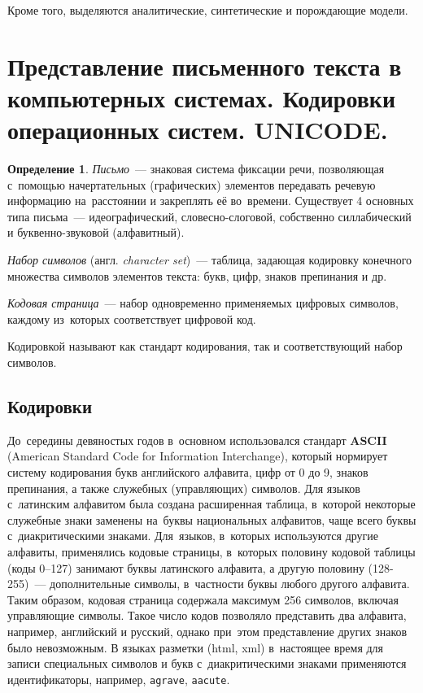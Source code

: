 \documentclass[12pt]{article}
\theoremstyle{definition}
\newtheorem*{defn}{Определение}
\theoremstyle{remark}
\numberwithin{equation}{section}
\begin{document}
Кроме того, выделяются аналитические, синтетические и порождающие модели.

\section{Представление письменного текста в компьютерных системах. 
Кодировки операционных систем. UNICODE.}
\begin{defn}
\textsl{Письмо}~--- знаковая система фиксации речи, позволяющая с~помощью 
начертательных (графических) элементов передавать речевую информацию 
на~расстоянии и закреплять её во~времени. Существует 4 основных типа 
письма~--- идеографический, словесно-слоговой, собственно силлабический 
и буквенно-звуковой (алфавитный).

{\sl Набор символов} (англ. {\sl character set})~--- таблица, задающая 
кодировку конечного множества символов элементов текста: букв, цифр, 
знаков препинания и др.

{\sl Кодовая страница}~--- набор одновременно применяемых цифровых символов, 
каждому из~которых соответствует цифровой код.
\end{defn}

Кодировкой называют как стандарт кодирования, так и соответствующий набор 
символов.

\subsection{Кодировки}
До~середины девяностых годов в~основном использовался стандарт \textbf{ASCII} 
(American Standard Code for Information Interchange), который нормирует систему 
кодирования букв английского алфавита, цифр от 0 до 9, знаков препинания, а также 
служебных (управляющих) символов. Для языков с~латинским алфавитом была создана 
расширенная таблица, в~которой некоторые служебные знаки заменены на~буквы 
национальных алфавитов, чаще всего буквы с~диакритическими знаками. Для~языков, 
в~которых используются другие алфавиты, применялись кодовые страницы, в~которых 
половину кодовой таблицы (коды 0--127) занимают буквы латинского алфавита, 
а другую половину (128-255)~--- дополнительные символы, в~частности буквы любого 
другого алфавита. Таким образом, кодовая страница содержала максимум 256 символов, 
включая управляющие символы. Такое число кодов позволяло представить два алфавита, 
например, английский и русский, однако при~этом представление других знаков 
было невозможным. В языках разметки (html, xml) в~настоящее время для записи 
специальных символов и букв с~диакритическими знаками применяются идентификаторы, 
например, \texttt{agrave}, \texttt{aacute}.
\end{document}

